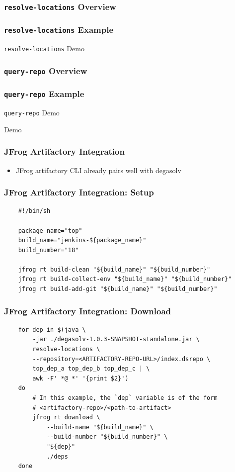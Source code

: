 \documentclass{beamer}
\begin{document}
\begin{frame}
  \frametitle{\texttt{resolve-locations} Overview}
\end{frame}
\begin{frame}
  \frametitle{\texttt{resolve-locations} Example}
\end{frame}
\begin{frame}
  \centerline{\color{blue}\Large \texttt{resolve-locations} Demo}
\end{frame}
\begin{frame}
  \frametitle{\texttt{query-repo} Overview}
\end{frame}
\begin{frame}
  \frametitle{\texttt{query-repo} Example}
\end{frame}
\begin{frame}
  \centerline{\color{blue}\Large \texttt{query-repo} Demo}
\end{frame}
\begin{frame}
  \centerline{\color{blue}\Large Demo}
\end{frame}
\begin{frame}[fragile]
  \frametitle{JFrog Artifactory Integration}
  \begin{itemize}
  \item JFrog artifactory CLI already pairs well with degasolv
  \end{itemize}
\end{frame}
\begin{frame}[fragile]
\frametitle{JFrog Artifactory Integration: Setup}
\begin{verbatim}
    #!/bin/sh

    package_name="top"
    build_name="jenkins-${package_name}"
    build_number="18"

    jfrog rt build-clean "${build_name}" "${build_number}"
    jfrog rt build-collect-env "${build_name}" "${build_number}"
    jfrog rt build-add-git "${build_name}" "${build_number}"
\end{verbatim}
\end{frame}
\begin{frame}[fragile]
\frametitle{JFrog Artifactory Integration: Download}
\begin{verbatim}
    for dep in $(java \
        -jar ./degasolv-1.0.3-SNAPSHOT-standalone.jar \
        resolve-locations \
        --repository=<ARTIFACTORY-REPO-URL>/index.dsrepo \
        top_dep_a top_dep_b top_dep_c | \
        awk -F' *@ *' '{print $2}')
    do
        # In this example, the `dep` variable is of the form
        # <artifactory-repo>/<path-to-artifact>
        jfrog rt download \
            --build-name "${build_name}" \
            --build-number "${build_number}" \
            "${dep}"
            ./deps
    done
\end{verbatim}
\end{frame}
\end{document}
